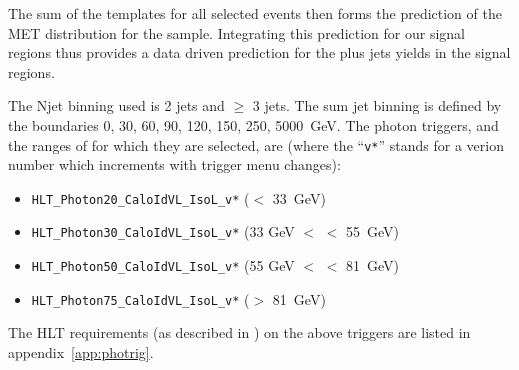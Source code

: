 

The sum of the templates for all selected \Z events then forms the 
prediction of the MET distribution for the \Z sample. Integrating this prediction for our 
signal regions  thus provides a data driven prediction for the \Z plus jets yields in the 
signal regions. 

The Njet binning used is 2 jets and $\ge$ 3 jets. 
The sum jet \pt binning is defined by the boundaries {0, 30, 60, 90, 120, 150, 250, 5000}~GeV.
The photon triggers, and the ranges of \Z \pt for which they are selected, are (where the ``\verb=v*='' stands for a verion number which increments with trigger menu changes):

\begin{itemize}
\item \verb=HLT_Photon20_CaloIdVL_IsoL_v*= (\Z \pt $<$ 33~GeV)
\item \verb=HLT_Photon30_CaloIdVL_IsoL_v*= (33 GeV $<$ \Z \pt $<$ 55~GeV)
\item \verb=HLT_Photon50_CaloIdVL_IsoL_v*= (55 GeV $<$ \Z \pt $<$ 81~GeV)
\item \verb=HLT_Photon75_CaloIdVL_IsoL_v*= (\Z \pt $>$ 81~GeV)
\end{itemize}

The HLT requirements (as described in \cite{ref:eghlt}) on the above triggers are listed in appendix~\ref{app:photrig}.


